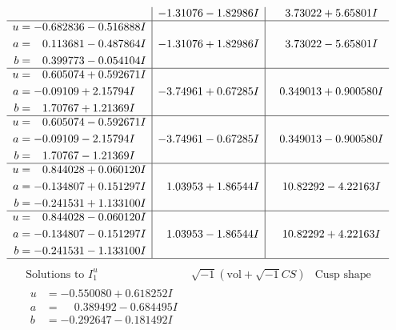 \documentclass[1p]{elsarticle_modified}
\theoremstyle{definition}
\newcommand{\I}{\sqrt{-1}}
\begin{document}
$$\begin{array}{c|c|c}
 & -1.31076 - 1.82986 I & \phantom{-}3.73022 + 5.65801 I \\ \hline\begin{aligned}
u &= -0.682836 - 0.516888 I \\
a &= \phantom{-}0.113681 - 0.487864 I \\
b &= \phantom{-}0.399773 - 0.054104 I\end{aligned}
 & -1.31076 + 1.82986 I & \phantom{-}3.73022 - 5.65801 I \\ \hline\begin{aligned}
u &= \phantom{-}0.605074 + 0.592671 I \\
a &= -0.09109 + 2.15794 I \\
b &= \phantom{-}1.70767 + 1.21369 I\end{aligned}
 & -3.74961 + 0.67285 I & \phantom{-}0.349013 + 0.900580 I \\ \hline\begin{aligned}
u &= \phantom{-}0.605074 - 0.592671 I \\
a &= -0.09109 - 2.15794 I \\
b &= \phantom{-}1.70767 - 1.21369 I\end{aligned}
 & -3.74961 - 0.67285 I & \phantom{-}0.349013 - 0.900580 I \\ \hline\begin{aligned}
u &= \phantom{-}0.844028 + 0.060120 I \\
a &= -0.134807 + 0.151297 I \\
b &= -0.241531 + 1.133100 I\end{aligned}
 & \phantom{-}1.03953 + 1.86544 I & \phantom{-}10.82292 - 4.22163 I \\ \hline\begin{aligned}
u &= \phantom{-}0.844028 - 0.060120 I \\
a &= -0.134807 - 0.151297 I \\
b &= -0.241531 - 1.133100 I\end{aligned}
 & \phantom{-}1.03953 - 1.86544 I & \phantom{-}10.82292 + 4.22163 I\\
 \hline 
 \end{array}$$\newpage$$\begin{array}{c|c|c}  
\text{Solutions to }I^u_{1}& \I (\text{vol} + \sqrt{-1}CS) & \text{Cusp shape}\\
 \hline 
\begin{aligned}
u &= -0.550080 + 0.618252 I \\
a &= \phantom{-}0.389492 - 0.684495 I \\
b &= -0.292647 - 0.181492 I\end{aligned}

\end{array}$$
\end{document}
